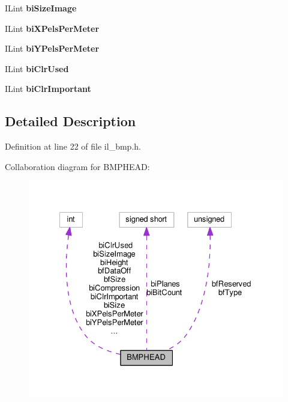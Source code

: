\begin{DoxyCompactItemize}
\item 
\mbox{\label{structBMPHEAD_af9f9c0ccec8f55ddd3038b46caa7bc1d}} 
I\+Lint {\bfseries bi\+Size\+Image}
\item 
\mbox{\label{structBMPHEAD_aa2a758ce0422b0ed1c00ff698a27fae7}} 
I\+Lint {\bfseries bi\+X\+Pels\+Per\+Meter}
\item 
\mbox{\label{structBMPHEAD_a02200b0010a75a66b525fb0f9154f382}} 
I\+Lint {\bfseries bi\+Y\+Pels\+Per\+Meter}
\item 
\mbox{\label{structBMPHEAD_a2cba59d7132cca1b1f58b30b9696a1a8}} 
I\+Lint {\bfseries bi\+Clr\+Used}
\item 
\mbox{\label{structBMPHEAD_a10bdc51355f49fe570e365e612dd3040}} 
I\+Lint {\bfseries bi\+Clr\+Important}
\end{DoxyCompactItemize}


\subsection{Detailed Description}


Definition at line 22 of file il\+\_\+bmp.\+h.



Collaboration diagram for B\+M\+P\+H\+E\+AD\+:
\nopagebreak
\begin{figure}[H]
\begin{center}
\leavevmode
\includegraphics[width=327pt]{d7/d03/structBMPHEAD__coll__graph}
\end{center}
\end{figure}


